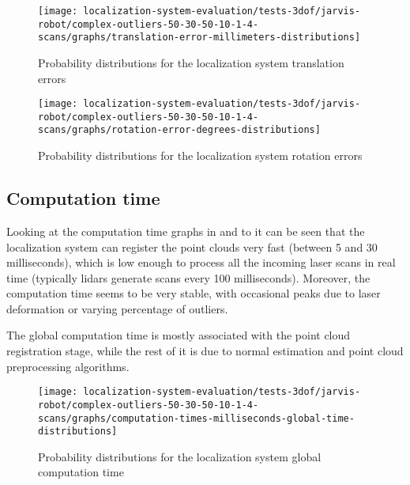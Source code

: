 \begin{figure}[H]
	\centering
	\begin{minipage}[H]{0.49\textwidth}
		\centering
		\texttt{[image: localization-system-evaluation/tests-3dof/jarvis-robot/complex-outliers-50-30-50-10-1-4-scans/graphs/translation-error-millimeters-distributions]}
		\caption{Probability distributions for the localization system translation errors}
		\label{fig:localization-system-evaluation_complex-path-with-outliers-50-30-50-10cm-per-sec-velocity-1-4-translation-error}
	\end{minipage}\hfill
	\begin{minipage}[H]{0.49\textwidth}
		\centering
		\texttt{[image: localization-system-evaluation/tests-3dof/jarvis-robot/complex-outliers-50-30-50-10-1-4-scans/graphs/rotation-error-degrees-distributions]}
		\caption{Probability distributions for the localization system rotation errors}
		\label{fig:localization-system-evaluation_complex-path-with-outliers-50-30-50-10cm-per-sec-velocity-1-4-rotation-error}
	\end{minipage}
\end{figure}



\subsection{Computation time}

Looking at the computation time graphs in  and to  it can be seen that the localization system can register the point clouds very fast (between 5 and 30 milliseconds), which is low enough to process all the incoming laser scans in real time (typically \glspl{lidar} generate scans every 100 milliseconds). Moreover, the computation time seems to be very stable, with occasional peaks due to laser deformation or varying percentage of outliers.

The global computation time is mostly associated with the point cloud registration stage, while the rest of it is due to normal estimation and point cloud preprocessing algorithms.

\begin{figure}[H]
	\centering
	\texttt{[image: localization-system-evaluation/tests-3dof/jarvis-robot/complex-outliers-50-30-50-10-1-4-scans/graphs/computation-times-milliseconds-global-time-distributions]}
	\caption{Probability distributions for the localization system global computation time}
	\label{fig:localization-system-evaluation_complex-path-with-outliers-50-30-50-10cm-per-sec-velocity-1-4-scans-computation-time}
\end{figure}



